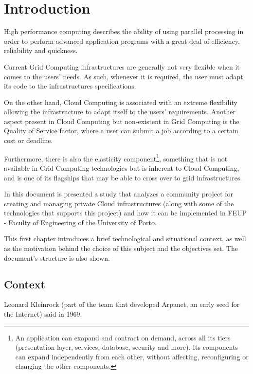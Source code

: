 \chapter{Introduction} \label{chap:intro}

High performance computing describes the ability of using parallel processing in order to perform advanced application programs with a great deal of efficiency, reliability and quickness. \cite{hpclinux}

Current Grid Computing infrastructures are generally not very flexible when it comes to the users' needs. As such, whenever it is required, the user must adapt its code to the infrastructures specifications.

On the other hand, Cloud Computing is associated with an extreme flexibility allowing the infrastructure to adapt itself to the users' requirements. Another aspect present in Cloud Computing but non-existent in Grid Computing is the Quality of Service factor, where a user can submit a job according to a certain cost or deadline.

Furthermore, there is also the elasticity component\footnote{An application can exapand and contract on demand, across all its tiers (presentation layer, services, database, security and more). Its components can expand independently from each other, without affecting, reconfiguring or changing the other components.}, something that is not available in Grid Computing technologies but is inherent to Cloud Computing, and is one of its flagships that may be able to cross over to grid infrastructures.

In this document is presented a study that analyzes a community project for creating and managing private Cloud infrastructures (along with some of the technologies that supports this project) and how it can be implemented in FEUP - Faculty of Engineering of the University of Porto.

This first chapter introduces a brief technological and situational context, as well as the motivation behind the choice of this subject and the objectives set. The document's structure is also shown.

\section{Context} \label{sec:context}

Leonard Kleinrock (part of the team that developed Arpanet, an early seed for the Internet) said in 1969:

